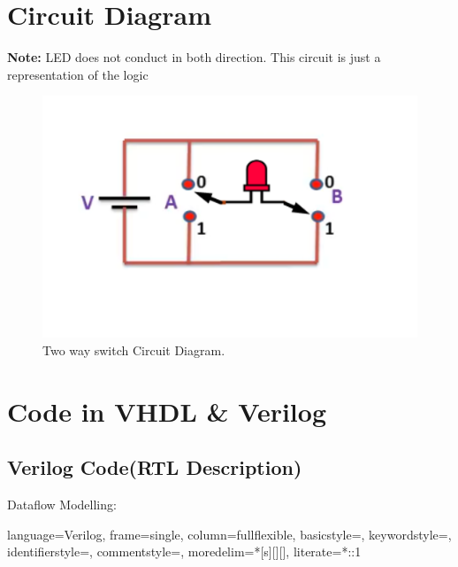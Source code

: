 \documentclass[12pt]{article}
\begin{document}
\newpage
\section{Circuit Diagram}
\textbf{Note:} LED does not conduct in both direction. This circuit is just a representation of the logic
\begin{figure}[H]
    \centering
    \includegraphics[scale=1.2]{new circuit.png}
    \caption{Two way switch Circuit Diagram.}
\end{figure}

\section{Code in VHDL \& Verilog}
\subsection{Verilog Code(RTL Description)}

\noindent Dataflow Modelling:


{
    language=Verilog,
    frame=single,
    column=fullflexible,
    basicstyle=\small\ttfamily,
    keywordstyle=\color{vblue},
    identifierstyle=\color{black},
    commentstyle=\color{vgreen},
    moredelim=*[s][]{[}{]},
    literate=*{:}{:}1
}

\makeatletter
\newcommand*\@lbracket{[}
\newcommand*\@rbracket{]}
\newcommand*\@colon{:}
\newcommand*\colorIndex{%
    \edef\@temp{\the\lst@token}%
    \ifx\@temp\@lbracket \color{black}%
    \else\ifx\@temp\@rbracket \color{black}%
    \else\ifx\@temp\@colon \color{black}%
    \else \color{vorange}%
    \fi\fi\fi
}
\makeatother
\end{document}
